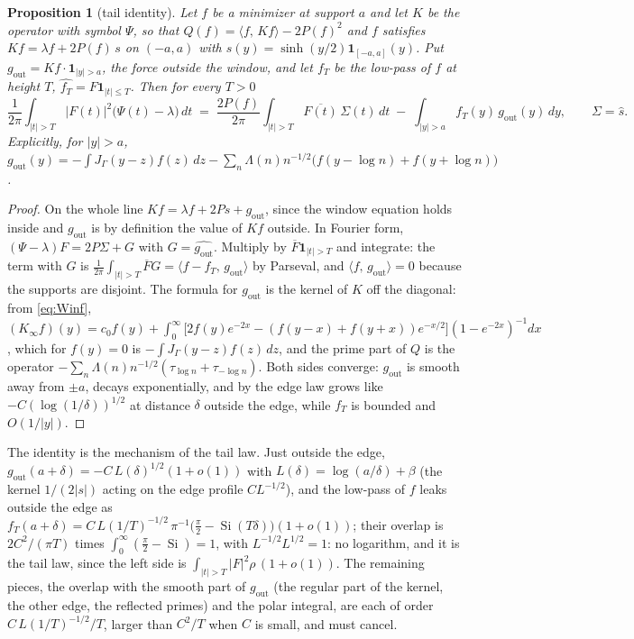 \documentclass[11pt]{article}
\newtheorem{proposition}[theorem]{Proposition}
\theoremstyle{definition}
\theoremstyle{remark}
\newcommand{\ip}[2]{\langle #1,\, #2\rangle}
\begin{document}
\begin{proposition}[tail identity]\label{prop:tailid}
Let $f$ be a minimizer at support $a$ and let $K$ be the operator with symbol $\Psi$, so that $Q(f)=\ip{f}{Kf}-2P(f)^2$ and $f$ satisfies $Kf=\lambda f+2P(f)\,s$ on $(-a,a)$ with $s(y)=\sinh(y/2)\mathbf 1_{[-a,a]}(y)$. Put $g_{\mathrm{out}}=Kf\cdot\mathbf 1_{|y|>a}$, the force outside the window, and let $f_T$ be the low-pass of $f$ at height $T$, $\widehat{f_T}=F\mathbf 1_{|t|\le T}$. Then for every $T>0$
\[
\frac1{2\pi}\int_{|t|>T}|F(t)|^2\big(\Psi(t)-\lambda\big)\,dt\;=\;\frac{2P(f)}{2\pi}\int_{|t|>T}\overline{F(t)}\,\Sigma(t)\,dt\;-\;\int_{|y|>a}f_T(y)\,g_{\mathrm{out}}(y)\,dy,\qquad \Sigma=\hat s .
\]
Explicitly, for $|y|>a$, $g_{\mathrm{out}}(y)=-\int J_\Gamma(y-z)f(z)\,dz-\sum_n\Lambda(n)n^{-1/2}\big(f(y-\log n)+f(y+\log n)\big)$.
\end{proposition}
\begin{proof}
On the whole line $Kf=\lambda f+2Ps+g_{\mathrm{out}}$, since the window equation holds inside and $g_{\mathrm{out}}$ is by definition the value of $Kf$ outside. In Fourier form, $(\Psi-\lambda)F=2P\Sigma+G$ with $G=\widehat{g_{\mathrm{out}}}$. Multiply by $\overline F\mathbf 1_{|t|>T}$ and integrate: the term with $G$ is $\frac1{2\pi}\int_{|t|>T}\overline FG=\ip{f-f_T}{g_{\mathrm{out}}}$ by Parseval, and $\ip f{g_{\mathrm{out}}}=0$ because the supports are disjoint. The formula for $g_{\mathrm{out}}$ is the kernel of $K$ off the diagonal: from \eqref{eq:Winf}, $(K_\infty f)(y)=c_0f(y)+\int_0^\infty\big[2f(y)e^{-2x}-(f(y-x)+f(y+x))e^{-x/2}\big](1-e^{-2x})^{-1}dx$, which for $f(y)=0$ is $-\int J_\Gamma(y-z)f(z)\,dz$, and the prime part of $Q$ is the operator $-\sum_n\Lambda(n)n^{-1/2}(\tau_{\log n}+\tau_{-\log n})$. Both sides converge: $g_{\mathrm{out}}$ is smooth away from $\pm a$, decays exponentially, and by the edge law grows like $-C(\log(1/\delta))^{1/2}$ at distance $\delta$ outside the edge, while $f_T$ is bounded and $O(1/|y|)$.
\end{proof}

The identity is the mechanism of the tail law. Just outside the edge, $g_{\mathrm{out}}(a+\delta)=-C\,L(\delta)^{1/2}(1+o(1))$ with $L(\delta)=\log(a/\delta)+\beta$ (the kernel $1/(2|s|)$ acting on the edge profile $CL^{-1/2}$), and the low-pass of $f$ leaks outside the edge as $f_T(a+\delta)=C\,L(1/T)^{-1/2}\,\pi^{-1}\big(\tfrac\pi2-\operatorname{Si}(T\delta)\big)(1+o(1))$; their overlap is $2C^2/(\pi T)$ times $\int_0^\infty(\tfrac\pi2-\operatorname{Si})=1$, with $L^{-1/2}L^{1/2}=1$: no logarithm, and it is the tail law, since the left side is $\int_{|t|>T}|F|^2\rho\,(1+o(1))$. The remaining pieces, the overlap with the smooth part of $g_{\mathrm{out}}$ (the regular part of the kernel, the other edge, the reflected primes) and the polar integral, are each of order $C\,L(1/T)^{-1/2}/T$, larger than $C^2/T$ when $C$ is small, and must cancel.
\end{document}
